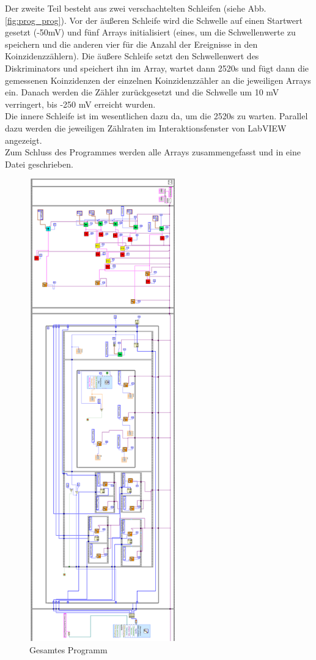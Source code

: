 Der zweite Teil besteht aus zwei verschachtelten Schleifen (siehe Abb. \ref{fig:prog_prog}). Vor der äußeren Schleife wird die Schwelle auf einen Startwert gesetzt (-50\si{\milli\volt}) und fünf Arrays initialisiert (eines, um die Schwellenwerte zu speichern und die anderen vier für die Anzahl der Ereignisse in den Koinzidenzzählern). Die äußere Schleife setzt den Schwellenwert des Diskriminators und speichert ihn im Array, wartet dann 2520\si{\second} und fügt dann die gemessenen Koinzidenzen der einzelnen Koinzidenzzähler an die jeweiligen Arrays ein. Danach werden die Zähler zurückgesetzt und die Schwelle um 10 \si{\milli\volt} verringert, bis -250 \si{\milli\volt} erreicht wurden.\\
Die innere Schleife ist im wesentlichen dazu da, um die 2520\si{\second} zu warten. Parallel dazu werden die jeweiligen Zählraten im Interaktionsfenster von LabVIEW angezeigt.\\
Zum Schluss des Programmes werden alle Arrays zusammengefasst und in eine Datei geschrieben.

\begin{figure}[h]
\centering
\includegraphics[height=20cm]{data/friedrich/prog_ges_rot.png}
\caption{Gesamtes Programm}
\label{fig:prog_all}
\end{figure}

